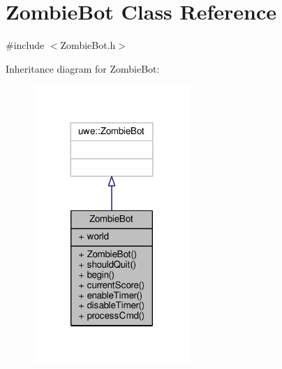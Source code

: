 \hypertarget{class_zombie_bot}{}\section{Zombie\+Bot Class Reference}
\label{class_zombie_bot}


{\ttfamily \#include $<$Zombie\+Bot.\+h$>$}



Inheritance diagram for Zombie\+Bot\+:
\nopagebreak
\begin{figure}[H]
\begin{center}
\leavevmode
\includegraphics[width=168pt]{class_zombie_bot__inherit__graph}
\end{center}
\end{figure}


